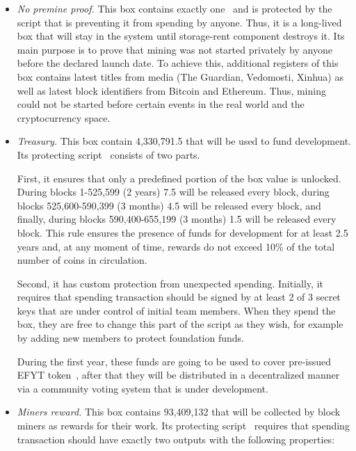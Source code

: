 \begin{itemize}
    \item{\em No premine proof.} This box contains exactly one~\Erg{} and is protected by the script
    that is preventing it from spending by anyone.
    Thus, it is a long-lived box that will stay in the system until storage-rent component
    destroys it.
    Its main purpose is to prove that \Ergo{} mining was not started privately by anyone before
    the declared launch date.
    To achieve this, additional registers of this box contains latest titles from media (The Guardian, Vedomosti, Xinhua)
    as well as latest block identifiers from Bitcoin and Ethereum.
    Thus, \Ergo{} mining could not be started before certain events in the real world and the
    cryptocurrency space.

    \item{\em Treasury.} This box contain 4,330,791.5 \Erg{} that will be used to fund \Ergo{}
    development.
    Its protecting script~\cite{link to corresponding ergo tree} consists of two parts.

    First, it ensures that only a predefined portion of the box value is unlocked.
    During blocks 1-525,599 (2 years) 7.5 \Erg{} will be released every block,
    during blocks 525,600-590,399 (3 months) 4.5 \Erg{} will be released every block, and finally,
    during blocks 590,400-655,199 (3 months) 1.5 \Erg{} will be released every block.
    This rule ensures the presence of funds for \Ergo{} development for at least 2.5 years and, at any moment of time,
    rewards do not exceed 10\% of the total number of coins in circulation.

    Second, it has custom protection from unexpected spending.
    Initially, it requires that spending transaction should be signed by at least 2 of 3 secret keys
    that are under control of initial team members. When they spend the box, they are free to
    change this part of the script as they wish, for example by adding new members to protect foundation
    funds.

    During the first year, these funds are going to be used to cover pre-issued EFYT token~\cite{our website with swap },
    after that they will be distributed in a decentralized manner via a community voting system that is under development.


    \item{\em Miners reward.} This box contains 93,409,132 \Erg{} that will be collected by block miners
    as rewards for their work.
    Its protecting script~\cite{link to corresponding ergo tree} requires that spending transaction
    should have exactly two outputs with the following properties:


\end{itemize}
